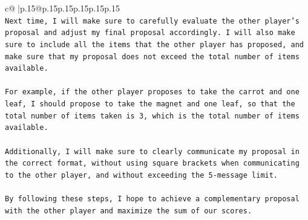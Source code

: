 \documentclass{article}
\begin{document}
{\begin{supertabular}{c@{$\;$}|p{.15\linewidth}@{}p{.15\linewidth}p{.15\linewidth}p{.15\linewidth}p{.15\linewidth}p{.15\linewidth}}
{{{\\ 
\texttt{Next time, I will make sure to carefully evaluate the other player's proposal and adjust my final proposal accordingly. I will also make sure to include all the items that the other player has proposed, and make sure that my proposal does not exceed the total number of items available. } \\
\\ 
\texttt{For example, if the other player proposes to take the carrot and one leaf, I should propose to take the magnet and one leaf, so that the total number of items taken is 3, which is the total number of items available. } \\
\\ 
\texttt{Additionally, I will make sure to clearly communicate my proposal in the correct format, without using square brackets when communicating to the other player, and without exceeding the 5{-}message limit. } \\
\\ 
\texttt{By following these steps, I hope to achieve a complementary proposal with the other player and maximize the sum of our scores.} \\
            }
        }
    }
     \\ \\

\end{supertabular}
}
\end{document}
